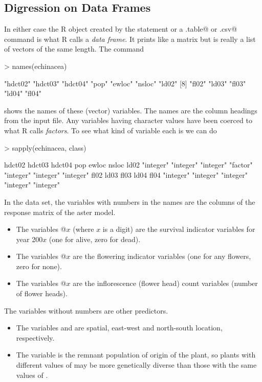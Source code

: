 \documentclass[11pt]{article}
\begin{document}
\subsection{Digression on Data Frames}

In either case the R object \verb@echinacea@ created by the \verb@data@
statement or a \verb@read.table@
or \verb@read.csv@ command is what R calls a \emph{data frame}.  It prints like
a matrix but is really a list of vectors of the same length.  The command
\begin{Schunk}
\begin{Sinput}
> names(echinacea)
\end{Sinput}
\begin{Soutput}
 [1] "hdct02" "hdct03" "hdct04" "pop"    "ewloc"  "nsloc"  "ld02"  
 [8] "fl02"   "ld03"   "fl03"   "ld04"   "fl04"  
\end{Soutput}
\end{Schunk}
shows the names of these (vector) variables.  The names are the column
headings from the input file.  Any variables having character values
have been coerced to what R calls \emph{factors}.  To see what kind of
variable each is we can do
\begin{Schunk}
\begin{Sinput}
> sapply(echinacea, class)
\end{Sinput}
\begin{Soutput}
   hdct02    hdct03    hdct04       pop     ewloc     nsloc      ld02 
"integer" "integer" "integer"  "factor" "integer" "integer" "integer" 
     fl02      ld03      fl03      ld04      fl04 
"integer" "integer" "integer" "integer" "integer" 
\end{Soutput}
\end{Schunk}

In the \verb@echinacea@ data set,
the variables with numbers in the names are the columns of the response
matrix of the aster model.
\begin{itemize}
\item
The variables @$x$ (where $x$ is
a digit) are the survival indicator variables for year 200$x$
(one for alive, zero for dead).
\item
The variables @$x$ are the flowering indicator variables
(one for any flowers, zero for none).
\item
The variables @$x$ are the inflorescence (flower head) count
variables (number of flower heads).
\end{itemize}
The variables without numbers are other predictors.
\begin{itemize}
\item
The variables \verb@ewloc@ and \verb@nsloc@ are spatial, east-west
and north-south location, respectively.
\item
The variable \verb@pop@ is the remnant population of origin of the plant,
so plants
with different values of \verb@pop@ may be more genetically diverse
than those with the same values of \verb@pop@.
\end{itemize}
\end{document}
